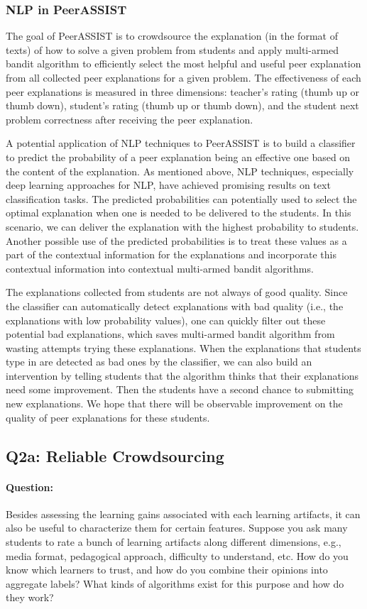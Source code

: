 \documentclass{article}
\begin{document}
\subsubsection{NLP in PeerASSIST}
The goal of PeerASSIST is to crowdsource the explanation (in the
format of texts) of how to solve a
given problem from students and apply multi-armed bandit algorithm to
efficiently select the most helpful and useful peer explanation from all collected
peer explanations for a given problem. The effectiveness of each peer
explanations is measured in three dimensions: teacher's rating (thumb
up or thumb down), student's rating (thumb up or thumb down), and the
student next problem correctness after receiving the peer explanation.

A potential application of NLP techniques to PeerASSIST is to build a
classifier to predict the probability of a peer explanation being an
effective one based on the content of the explanation. As mentioned
above, NLP techniques, especially deep learning approaches for NLP,
have achieved promising results on text classification tasks. The
predicted probabilities can potentially used to select the optimal
explanation when one is needed to be delivered to the students. In
this scenario, we can deliver the explanation with the highest
probability to students. Another possible use of the predicted
probabilities is to treat these values as a part of the contextual
information for the explanations and incorporate this contextual
information into contextual multi-armed bandit algorithms.

The explanations collected from students are not always of good
quality. Since the classifier can automatically detect explanations
with bad quality (i.e., the explanations with low probability values),
one can quickly filter out these potential bad explanations, which
saves multi-armed bandit algorithm from wasting attempts trying these
explanations. When the explanations
that students type in are detected as bad ones by the classifier, we
can also build an intervention by
telling students that the algorithm thinks that their explanations
need some improvement. Then the students have a second chance to
submitting new explanations. We hope that there will be observable
improvement on the quality of peer explanations for these students.

\subsection{Q2a: Reliable Crowdsourcing}
\paragraph{Question:} Besides assessing the learning gains associated
with each learning artifacts, it can also be useful to characterize
them for certain features. Suppose you ask many students to rate a
bunch of learning artifacts along different dimensions, e.g., media
format, pedagogical approach, difficulty to understand, etc. How do
you know which learners to trust, and how do you combine their
opinions into aggregate labels? What kinds of algorithms exist for
this purpose and how do they work? \\ [0.1 in]
\end{document}
